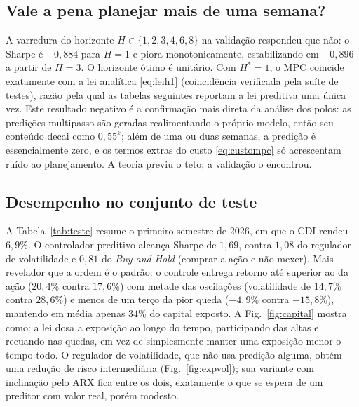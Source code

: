 \documentclass[conference]{IEEEtran}
\begin{document}
\subsection{Vale a pena planejar mais de uma semana?}\label{sec:res-horizonte}

A varredura do horizonte $H \in \{1,2,3,4,6,8\}$ na validação respondeu que não: o Sharpe é $-0{,}884$ para $H=1$ e piora monotonicamente, estabilizando em $-0{,}896$ a partir de $H=3$. O horizonte ótimo é unitário. Com $H^{*}=1$, o MPC coincide exatamente com a lei analítica \eqref{eq:leih1} (coincidência verificada pela suíte de testes), razão pela qual as tabelas seguintes reportam a lei preditiva uma única vez. Este resultado negativo é a confirmação mais direta da análise dos polos: as predições multipasso são geradas realimentando o próprio modelo, então seu conteúdo decai como $0{,}55^k$; além de uma ou duas semanas, a predição é essencialmente zero, e os termos extras do custo \eqref{eq:custompc} só acrescentam ruído ao planejamento. A teoria previu o teto; a validação o encontrou.

\subsection{Desempenho no conjunto de teste}\label{sec:res-teste}

A Tabela~\ref{tab:teste} resume o primeiro semestre de 2026, em que o CDI rendeu $6{,}9\%$. O controlador preditivo alcança Sharpe de $1{,}69$, contra $1{,}08$ do regulador de volatilidade e $0{,}81$ do \emph{Buy and Hold} (comprar a ação e não mexer). Mais revelador que a ordem é o padrão: o controle entrega retorno até superior ao da ação ($20{,}4\%$ contra $17{,}6\%$) com metade das oscilações (volatilidade de $14{,}7\%$ contra $28{,}6\%$) e menos de um terço da pior queda ($-4{,}9\%$ contra $-15{,}8\%$), mantendo em média apenas $34\%$ do capital exposto. A Fig.~\ref{fig:capital} mostra como: a lei dosa a exposição ao longo do tempo, participando das altas e recuando nas quedas, em vez de simplesmente manter uma exposição menor o tempo todo. O regulador de volatilidade, que não usa predição alguma, obtém uma redução de risco intermediária (Fig.~\ref{fig:expvol}); sua variante com inclinação pelo ARX fica entre os dois, exatamente o que se espera de um preditor com valor real, porém modesto.
\end{document}
